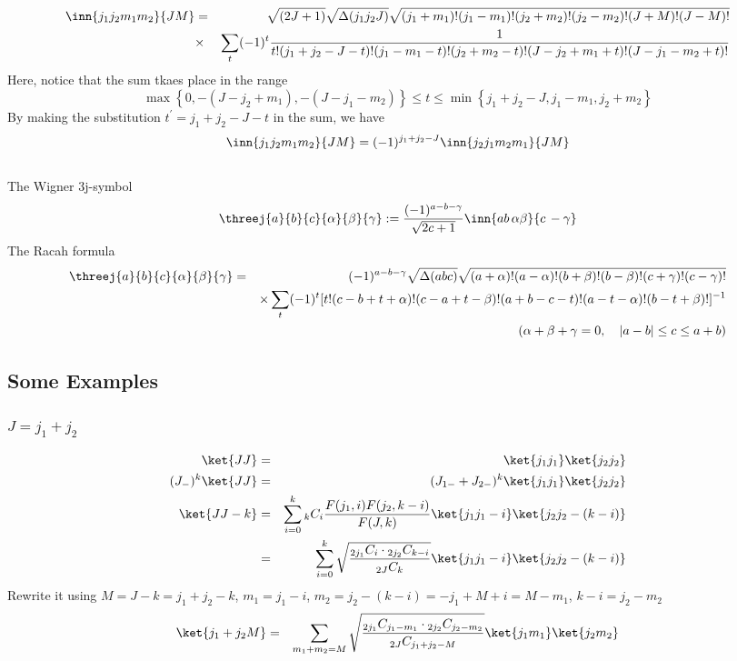 \documentclass{article}
\begin{document}
{\begin{eqnarray}
\inn{j_1j_2m_1m_2}{JM} & = & \sqrt{(2J+1)}\sqrt{\Delta(j_1j_2J)}\sqrt{(j_1 + m_1)!(j_1-m_1)!(j_2+m_2 )!(j_2-m_2)!(J+M)!(J-M)!}  \nonumber\\
 & \times &  \sum_{\substack{t}} (-1)^t \frac{1}{t!(j_1 + j_2 -J - t)!(j_1 - m_1 - t)!(j_2 +m_2 -t)!(J-j_2 +m_1+t)!(J-j_1 -m_2 +t)!} \nonumber\\
\end{eqnarray}
Here, notice that the sum tkaes place in the range
\begin{equation}
\label{}
\max \left\{0,-(J-j_2 +m_1),-(J-j_1 -m_2)\right\} \le t \le \min \left\{j_1 + j_2 -J,j_1 - m_1,j_2 +m_2\right\}
\end{equation}
By making the substitution $t^{\prime}=j_{1}+j_{2}-J-t$ in the sum, we have
\begin{equation}
\label{}
\inn{j_1j_2m_1m_2}{JM} = (-1)^{j_{1}+j_{2}-J}\inn{j_2j_1m_2m_1}{JM}
\end{equation}
\\
The Wigner 3j-symbol
\begin{equation}
\label{ }
\threej{a}{b}{c}{\alpha}{\beta}{\gamma} := \frac{(-1)^{a-b-\gamma}}{\sqrt{2c+1}}\inn{ab\,\alpha\beta}{c\,-\gamma}
\end{equation} 
The Racah formula
\begin{eqnarray}
\threej{a}{b}{c}{\alpha}{\beta}{\gamma} & = & (-1)^{a-b-\gamma}\sqrt{\Delta(abc)}\sqrt{(a+\alpha)!(a-\alpha)!(b+\beta)!(b-\beta)!(c+\gamma)!(c-\gamma)!} \nonumber\\
 && \times \sum_t (-1)^t [t!(c-b+t+\alpha)!(c-a+t-\beta)!(a+b-c-t)!(a-t-\alpha)!(b-t+\beta)!]^{-1} \nonumber\\
 &&(\alpha + \beta + \gamma =0, \quad |a-b| \le c \le a+b) \nonumber
\end{eqnarray}

\subsection{Some Examples}
\label{sec-5-3}
\subsubsection{$J=j_1+j_2$}
\label{sec-5-3-1}
\begin{eqnarray}
\ket{JJ} & = & \ket{j_1j_1}\ket{j_2j_2} \\
(J_{-})^k\ket{JJ} & = &(J_{1-}+J_{2-})^k \ket{j_1j_1}\ket{j_2j_2} \\ 
\ket{JJ-k} & = &\sum_{i=0}^{k} {}_{k}C_{i}\frac{ F(j_1,i)F(j_2,k-i)}{F(J,k)} \ket{j_1j_1-i}\ket{j_2j_2-(k-i)} \\ 
           & = &\sum_{i=0}^{k} \sqrt{\frac{ {}_{2j_1}C_{i}\cdot {}_{2j_2}C_{k-i}}{{}_{2J}C_{k}}} \ket{j_1j_1-i}\ket{j_2j_2-(k-i)}
\end{eqnarray}
Rewrite it using $M= J-k= j_1 +j_2 -k$, $m_1 = j_1 - i$, $m_2= j_2 - (k-i) = -j_1 +M +i = M - m_1$, $k-i= j_2 -m_2$
\begin{eqnarray}
\ket{j_1+j_2M}  & = &\sum_{m_1 +m_2=M} \sqrt{\frac{ {}_{2j_1}C_{j_1 -m_1}\cdot {}_{2j_2}C_{j_2-m_2}}{{}_{2J}C_{j_1 +j_2 -M}}} \ket{j_1m_1}\ket{j_2m_2}
\end{eqnarray}

}
\end{document}
